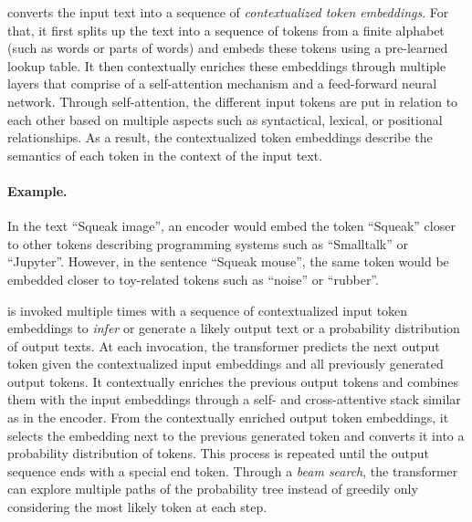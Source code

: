 \begin{description}[noextralabelsep]
	\item[The encoder] converts the input text into a sequence of \emph{contextualized token embeddings}.
	For that, it first splits up the text into a sequence of tokens from a finite alphabet (such as words or parts of words) and embeds these tokens using a pre-learned lookup table.
	It then contextually enriches these embeddings through multiple layers that comprise of a self-attention mechanism and a feed-forward neural network.
	Through self-attention, the different input tokens are put in relation to each other based on multiple aspects such as syntactical, lexical, or positional relationships.
	As a result, the contextualized token embeddings describe the semantics of each token in the context of the input text.

	\begin{example}
		\paragraph{Example.}
		In the text ``Squeak image'', an encoder would embed the token ``Squeak'' closer to other tokens describing programming systems such as ``Smalltalk'' or ``Jupyter''.
		However, in the sentence ``Squeak mouse'', the same token would be embedded closer to toy-related tokens such as ``noise'' or ``rubber''.
	\end{example}

	\item[The decoder] is invoked multiple times with a sequence of contextualized input token embeddings to \emph{infer} or generate a likely output text or a probability distribution of output texts.
	At each invocation, the transformer predicts the next output token given the contextualized input embeddings and all previously generated output tokens.
	It contextually enriches the previous output tokens and combines them with the input embeddings through a self- and cross-attentive stack similar as in the encoder.
	From the contextually enriched output token embeddings, it selects the embedding next to the previous generated token and converts it into a probability distribution of tokens.
	This process is repeated until the output sequence ends with a special end token.
	Through a \emph{beam search}, the transformer can explore multiple paths of the probability tree instead of greedily only considering the most likely token at each step.


\end{description}

